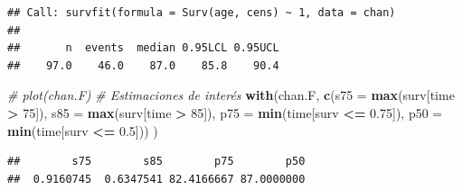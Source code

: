 \documentclass[]{book}
\newenvironment{Shaded}{\begin{snugshade}}{\end{snugshade}}
\newcommand{\KeywordTok}[1]{\textcolor[rgb]{0.13,0.29,0.53}{\textbf{#1}}}
\newcommand{\DataTypeTok}[1]{\textcolor[rgb]{0.13,0.29,0.53}{#1}}
\newcommand{\DecValTok}[1]{\textcolor[rgb]{0.00,0.00,0.81}{#1}}
\newcommand{\FloatTok}[1]{\textcolor[rgb]{0.00,0.00,0.81}{#1}}
\newcommand{\StringTok}[1]{\textcolor[rgb]{0.31,0.60,0.02}{#1}}
\newcommand{\CommentTok}[1]{\textcolor[rgb]{0.56,0.35,0.01}{\textit{#1}}}
\newcommand{\OperatorTok}[1]{\textcolor[rgb]{0.81,0.36,0.00}{\textbf{#1}}}
\newcommand{\NormalTok}[1]{#1}
\theoremstyle{definition}
\theoremstyle{definition}
\theoremstyle{definition}
\theoremstyle{remark}
\begin{document}
\begin{Shaded}
\end{Shaded}

\begin{verbatim}
## Call: survfit(formula = Surv(age, cens) ~ 1, data = chan)
## 
##       n  events  median 0.95LCL 0.95UCL 
##    97.0    46.0    87.0    85.8    90.4
\end{verbatim}

\begin{Shaded}
\begin{Highlighting}[]
\CommentTok{# plot(chan.F)}
\CommentTok{# Estimaciones de interés}
\KeywordTok{with}\NormalTok{(chan.F, }
    \KeywordTok{c}\NormalTok{(}\DataTypeTok{s75 =} \KeywordTok{max}\NormalTok{(surv[time }\OperatorTok{>}\StringTok{ }\DecValTok{75}\NormalTok{]), }\DataTypeTok{s85 =} \KeywordTok{max}\NormalTok{(surv[time }\OperatorTok{>}\StringTok{ }\DecValTok{85}\NormalTok{]),}
      \DataTypeTok{p75 =} \KeywordTok{min}\NormalTok{(time[surv }\OperatorTok{<=}\StringTok{ }\FloatTok{0.75}\NormalTok{]), }\DataTypeTok{p50 =} \KeywordTok{min}\NormalTok{(time[surv }\OperatorTok{<=}\StringTok{ }\FloatTok{0.5}\NormalTok{])) }
\NormalTok{)}
\end{Highlighting}
\end{Shaded}

\begin{verbatim}
##        s75        s85        p75        p50 
##  0.9160745  0.6347541 82.4166667 87.0000000
\end{verbatim}
\end{document}
